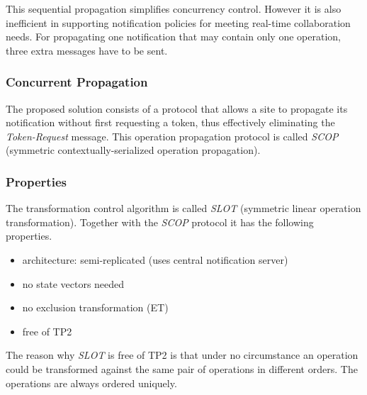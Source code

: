 This sequential propagation simplifies concurrency control. However it is also inefficient in supporting notification policies for meeting real-time collaboration needs. For propagating one notification that may contain only one operation, three extra messages have to be sent.


\subsubsection{Concurrent Propagation}
The proposed solution consists of a protocol that allows a site to propagate its notification without first requesting a token, thus effectively eliminating the \emph{Token-Request} message. This operation propagation protocol is called \emph{SCOP} (symmetric contextually-serialized operation propagation). 


\subsubsection{Properties}
The transformation control algorithm is called \emph{SLOT} (symmetric linear operation transformation). Together with the \emph{SCOP} protocol it has the following properties.

\begin{itemize}
 \item architecture: semi-replicated (uses central notification server)
 \item no state vectors needed
 \item no exclusion transformation (ET)
 \item free of TP2
\end{itemize}

The reason why \emph{SLOT} is free of TP2 is that under no circumstance an operation could be transformed against the same pair of operations in different orders. The operations are always ordered uniquely.

